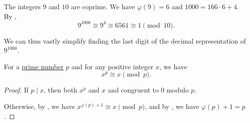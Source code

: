 \begin{example}\label{ex:division_modulo}
  The integers \( 9 \) and \( 10 \) are coprime. We have \( \varphi(9) = 6 \) and \( 1000 = 166 \cdot 6 + 4 \). By ,
  \begin{equation*}
    9^{1000} \cong 9^4 \cong 6561 \cong 1 \pmod {10}.
  \end{equation*}

  We can thus vastly simplify finding the last digit of the decimal representation of \( 9^{1000} \).
\end{example}

\begin{theorem}\label{thm:fermats_little_theorem}
  For a \hyperref[def:prime_number]{prime number} \( p \) and for any positive integer \( x \), we have
  \begin{equation*}
    x^p \cong x \pmod p.
  \end{equation*}
\end{theorem}
\begin{proof}
  If \( p \mid x \), then both \( x^p \) and \( x \) and congruent to \( 0 \) modulo \( p \).

  Otherwise, by , we have \( x^{\varphi(p) + 1} \cong x \pmod p \), and by , we have \( \varphi(p) + 1 = p \).
\end{proof}
